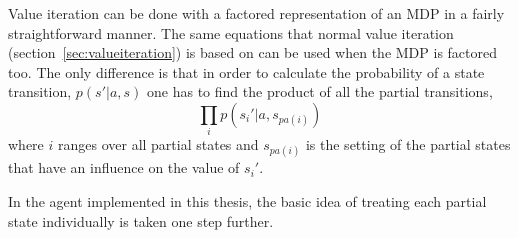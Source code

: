 Value iteration can be done with a factored representation of an MDP in a fairly straightforward manner. The same equations that normal value iteration (section~\ref{sec:valueiteration}) is based on can be used when the MDP is factored too. The only difference is that in order to calculate the probability of a state transition, $p(s'| a, s)$ one has to find the product of all the partial transitions,
$$\prod\limits _{i} p(s_i' | a, s_{pa(i)})$$
where $i$ ranges over all partial states and $s_{pa(i)}$ is the setting of the partial states that have an influence on the value of $s_i'$. 

In the agent implemented in this thesis, the basic idea of treating each partial state individually is taken one step further.